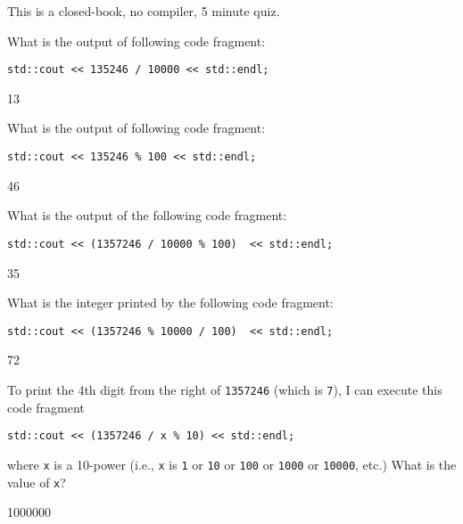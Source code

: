 

This is a closed-book, no compiler, 5 minute quiz.

\nextq
What is the output of following code fragment:
\begin{Verbatim}[frame=single,fontsize=\footnotesize]
std::cout << 135246 / 10000 << std::endl;
\end{Verbatim}
\ANSWER
\begin{answercode}
13
\end{answercode}

\nextq
What is the output of following code fragment:
\begin{Verbatim}[frame=single,fontsize=\footnotesize]
std::cout << 135246 % 100 << std::endl;
\end{Verbatim}
\ANSWER
\begin{answercode}
46
\end{answercode}

\nextq
What is the output of the following code fragment:
\begin{Verbatim}[frame=single,fontsize=\footnotesize]
std::cout << (1357246 / 10000 % 100)  << std::endl;
\end{Verbatim}
\ANSWER
\begin{answercode}
35
\end{answercode}

\nextq
What is the integer printed by the following code fragment:
\begin{Verbatim}[frame=single,fontsize=\footnotesize]
std::cout << (1357246 % 10000 / 100)  << std::endl;
\end{Verbatim}
\ANSWER
\begin{answercode}
72
\end{answercode}

\nextq
To print the 4th digit from the right of \verb!1357246! (which is \verb!7!),
I can execute this code fragment
\begin{Verbatim}[frame=single,fontsize=\footnotesize]
std::cout << (1357246 / x % 10) << std::endl;
\end{Verbatim}
where \verb!x! is a 10-power
(i.e., \verb!x! is \verb!1! or \verb!10! or \verb!100! or \verb!1000!
or \verb!10000!, etc.)
What is the value of \verb!x!?
\\
\ANSWER
\begin{answercode}
1000000
\end{answercode}

